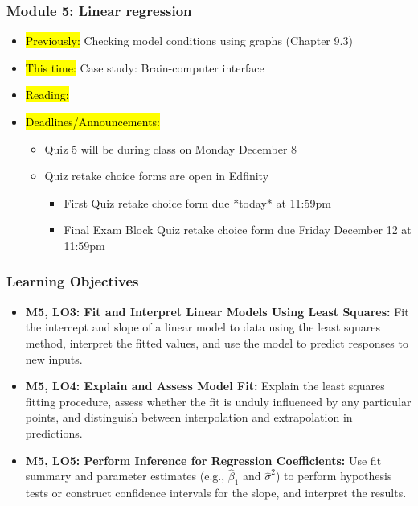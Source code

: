 
\begin{frame}
    \frametitle{Module 5: Linear regression}
    \begin{itemize}
        \item \hl{Previously: }Checking model conditions using graphs (Chapter 9.3)
        \item \hl{This time: }Case study: Brain-computer interface
        \item \hl{Reading: }
        \item \hl{Deadlines/Announcements: }
        \begin{itemize}
            \item Quiz 5 will be during class on Monday December 8
            \item Quiz retake choice forms are open in Edfinity
            \begin{itemize}
                \item First Quiz retake choice form due *today* at 11:59pm
                \item Final Exam Block Quiz retake choice form due Friday December 12 at 11:59pm
            \end{itemize}
        \end{itemize}
    \end{itemize}
    
\end{frame}

\begin{frame}
    \frametitle{Learning Objectives}
    \begin{itemize}
        \item \textbf{M5, LO3: Fit and Interpret Linear Models Using Least Squares:} Fit the intercept and slope of a linear model to data using the least squares method, interpret the fitted values, and use the model to predict responses to new inputs.
        \item \textbf{M5, LO4: Explain and Assess Model Fit:} Explain the least squares fitting procedure, assess whether the fit is unduly influenced by any particular points, and distinguish between interpolation and extrapolation in predictions.
        \item \textbf{M5, LO5: Perform Inference for Regression Coefficients:} Use fit summary and parameter estimates (e.g., $\hat{\beta}_1$ and $\hat{\sigma}^2$) to perform hypothesis tests or construct confidence intervals for the slope, and interpret the results.
    \end{itemize}
\end{frame}
    
